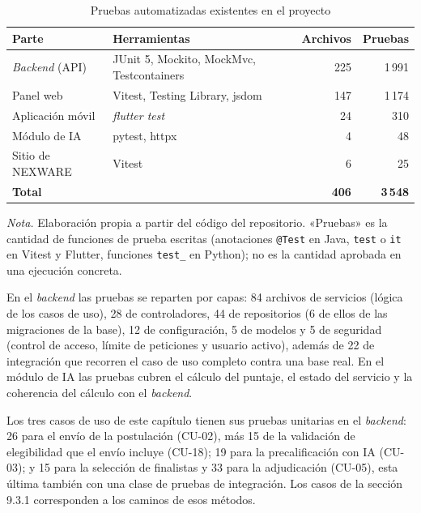 \begin{table}[H]
\centering
\caption{Pruebas automatizadas existentes en el proyecto}
\label{tab:pruebas_proyecto}
\small
\begin{tabular}{@{}>{\raggedright\arraybackslash}p{3.6cm}>{\raggedright\arraybackslash}p{4.6cm}rr@{}}
\toprule
\textbf{Parte} & \textbf{Herramientas} & \textbf{Archivos} & \textbf{Pruebas} \\
\midrule
\textit{Backend} (API) & JUnit 5, Mockito, MockMvc, Testcontainers & 225 & 1\,991 \\
Panel web & Vitest, Testing Library, jsdom & 147 & 1\,174 \\
Aplicación móvil & \textit{flutter test} & 24 & 310 \\
Módulo de IA & pytest, httpx & 4 & 48 \\
Sitio de NEXWARE & Vitest & 6 & 25 \\
\midrule
\textbf{Total} & & \textbf{406} & \textbf{3\,548} \\
\bottomrule
\end{tabular}

\vspace{2pt}
\footnotesize\textit{Nota.} Elaboración propia a partir del código del repositorio. «Pruebas» es la cantidad de funciones de prueba escritas (anotaciones \texttt{@Test} en Java, \texttt{test} o \texttt{it} en Vitest y Flutter, funciones \texttt{test\_} en Python); no es la cantidad aprobada en una ejecución concreta.
\end{table}

En el \textit{backend} las pruebas se reparten por capas: 84 archivos de servicios (lógica de los casos de uso), 28 de controladores, 44 de repositorios (6 de ellos de las migraciones de la base), 12 de configuración, 5 de modelos y 5 de seguridad (control de acceso, límite de peticiones y usuario activo), además de 22 de integración que recorren el caso de uso completo contra una base real. En el módulo de IA las pruebas cubren el cálculo del puntaje, el estado del servicio y la coherencia del cálculo con el \textit{backend}.

Los tres casos de uso de este capítulo tienen sus pruebas unitarias en el \textit{backend}: 26 para el envío de la postulación (CU-02), más 15 de la validación de elegibilidad que el envío incluye (CU-18); 19 para la precalificación con IA (CU-03); y 15 para la selección de finalistas y 33 para la adjudicación (CU-05), esta última también con una clase de pruebas de integración. Los casos de la sección 9.3.1 corresponden a los caminos de esos métodos.

